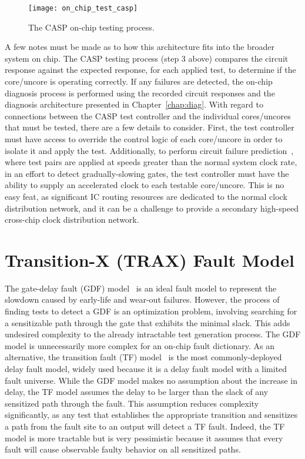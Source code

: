 \begin{figure}[hbtp]
\centering
\texttt{[image: on\_chip\_test\_casp]}
\caption{The CASP on-chip testing process.}
\label{fig:on_chip_test_casp}
\end{figure}

A few notes must be made as to how this architecture fits into the broader system on chip.
%
The CASP testing process (step 3 above) compares the circuit response against the expected response, for each applied test, to determine if the core/uncore is operating correctly.
%
If any failures are detected, the on-chip diagnosis process is performed using the recorded circuit responses and the diagnosis architecture presented in Chapter~\ref{chap:diag}.
%
With regard to connections between the CASP test controller and the individual cores/uncores that must be tested, there are a few details to consider.
%
First, the test controller must have access to override the control logic of each core/uncore in order to isolate it and apply the test.
%
Additionally, to perform circuit failure prediction~\cite{agarwal07}, where test pairs are applied at speeds greater than the normal system clock rate, in an effort to detect gradually-slowing gates, the test controller must have the ability to supply an accelerated clock to each testable core/uncore.
%
This is no easy feat, as significant IC routing resources are dedicated to the normal clock distribution network, and it can be a challenge to provide a secondary high-speed cross-chip clock distribution network.


\section{Transition-X (TRAX) Fault Model}
\label{sec:intro_trax}

The gate-delay fault (GDF) model~\cite{jha03} is an ideal fault model to represent the slowdown caused by early-life and wear-out failures.
%
However, the process of finding tests to detect a GDF is an optimization problem, involving searching for a sensitizable path through the gate that exhibits the minimal slack.
%
This adds undesired complexity to the already intractable test generation process.
%
The GDF model is unnecessarily more complex for an on-chip fault dictionary.
%
As an alternative, the transition fault (TF) model~\cite{jha03} is the most commonly-deployed delay fault model, widely used because it is a delay fault model with a limited fault universe.
%
While the GDF model makes no assumption about the increase in delay, the TF model assumes the delay to be larger than the slack of any sensitized path through the fault.
%
This assumption reduces complexity significantly, as any test that establishes the appropriate transition and sensitizes a path from the fault site to an output will detect a TF fault.
%
Indeed, the TF model is more tractable but is very pessimistic because it assumes that every fault will cause observable faulty behavior on all sensitized paths.%

